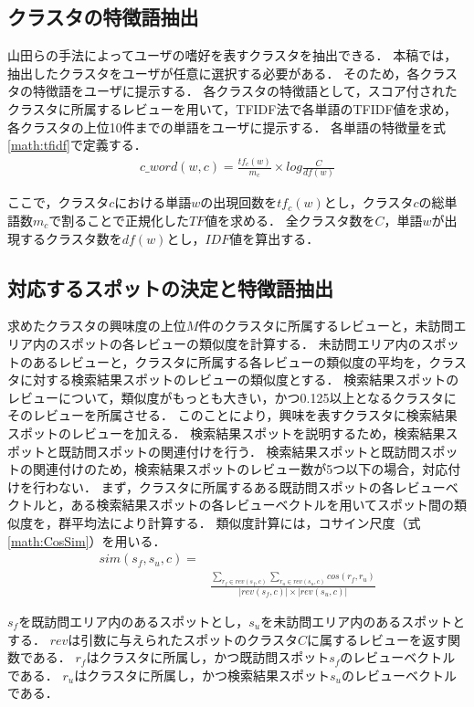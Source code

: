 \documentclass{deimj}
\begin{document}
\subsection{クラスタの特徴語抽出}
\label{sub:クラスタの特徴語抽出}
山田ら\cite{山田}の手法によってユーザの嗜好を表すクラスタを抽出できる．
本稿では，抽出したクラスタをユーザが任意に選択する必要がある．
そのため，各クラスタの特徴語をユーザに提示する．
各クラスタの特徴語として，スコア付されたクラスタに所属するレビューを用いて，TFIDF法で各単語のTFIDF値を求め，各クラスタの上位10件までの単語をユーザに提示する．
各単語の特徴量を式\ref{math:tfidf}で定義する．
\begin{eqnarray}
c\_word(w,c) = \frac{tf_c(w)}{m_c} \times log\frac{C}{df(w)}
    \label{math:tfidf}
\end{eqnarray}

ここで，クラスタ$c$における単語$w$の出現回数を$tf_{c}(w)$とし，クラスタ$c$の総単語数$m_c$で割ることで正規化した$TF$値を求める．
全クラスタ数を$C$，単語$w$が出現するクラスタ数を$df(w)$とし，$IDF$値を算出する．
\subsection{対応するスポットの決定と特徴語抽出}
求めたクラスタの興味度の上位$M$件のクラスタに所属するレビューと，未訪問エリア内のスポットの各レビューの類似度を計算する．
未訪問エリア内のスポットのあるレビューと，クラスタに所属する各レビューの類似度の平均を，クラスタに対する検索結果スポットのレビューの類似度とする．
検索結果スポットのレビューについて，類似度がもっとも大きい，かつ0.125以上となるクラスタにそのレビューを所属させる．
このことにより，興味を表すクラスタに検索結果スポットのレビューを加える．
検索結果スポットを説明するため，検索結果スポットと既訪問スポットの関連付けを行う．
検索結果スポットと既訪問スポットの関連付けのため，検索結果スポットのレビュー数が5つ以下の場合，対応付けを行わない．
まず，クラスタに所属するある既訪問スポットの各レビューベクトルと，ある検索結果スポットの各レビューベクトルを用いてスポット間の類似度を，群平均法により計算する．
類似度計算には，コサイン尺度（式\ref{math:CosSim}）を用いる．
\begin{eqnarray}
  sim(s_f,s_u,c)=\nonumber\\
  &\frac{\sum_{r_f \in rev(s_f,c)} \sum_{r_u \in rev(s_u,c)} cos(r_f,r_u)}{|rev(s_f,c)| \times |rev(s_u,c)|}
  \label{math:CosSim}
\end{eqnarray}

$s_f$を既訪問エリア内のあるスポットとし，$s_u$を未訪問エリア内のあるスポットとする．
$rev$は引数に与えられたスポットのクラスタ$C$に属するレビューを返す関数である．
$r_f$はクラスタに所属し，かつ既訪問スポット$s_f$のレビューベクトルである．
$r_u$はクラスタに所属し，かつ検索結果スポット$s_u$のレビューベクトルである．
\end{document}
